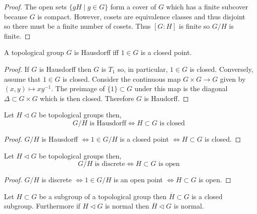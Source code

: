 \documentclass[12pt]{extarticle}
\begin{document}
\begin{proof}
The open sets $\{ g H \mid g \in G \}$ form a cover of $G$ which has a finite subcover because $G$ is compact. However, cosets are equivalence classes and thus disjoint so there must be a finite number of cosets. Thus $[G : H]$ is finite so $G / H$ is finite.  
\end{proof}

\begin{proposition}
A topological group $G$ is Hausdorff iff $1 \in G$ is a closed point.
\end{proposition}

\begin{proof}
If $G$ is Hausdorff then $G$ is $T_1$ so, in particular, $1 \in G$ is closed. Conversely, assume that $1 \in G$ is closed. Consider the continuous map $G \times G \to G$ given by $(x, y) \mapsto x y^{-1}$. The preimage of $\{ 1 \} \subset G$ under this map is the diagonal $\Delta \subset G \times G$ which is then closed. Therefore $G$ is Haudorff. 
\end{proof}

\begin{proposition}
Let $H \triangleleft G$ be topological groups then,
\[ G / H \text{ is Hausdorff} \iff H \subset G \text{ is closed} \] 
\end{proposition}

\begin{proof}
$G / H$ is Hausdorff $\iff 1 \in G / H$ is a closed point $\iff H \subset G$ is closed. 
\end{proof}

\begin{proposition}
Let $H \triangleleft G$ be topological groups then,
\[ G / H \text{ is discrete} \iff H \subset G \text{ is open} \] 
\end{proposition}

\begin{proof}
$G / H$ is discrete $\iff 1 \in G / H$ is an open point $\iff H \subset G$ is open. 
\end{proof}

\begin{proposition}
Let $H \subset G$ be a subgroup of a topological group then $\overline{H} \subset G$ is a closed subgroup. Furthermore if $H \triangleleft G$ is normal then $\overline{H} \triangleleft G$ is normal.
\end{proposition}
\end{document}
